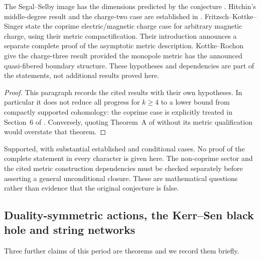\begin{theorem}\label{thm:senconj}
The Segal--Selby image has the dimensions predicted by the conjecture \cite{SegalSelby96}. Hitchin's middle-degree result and the charge-two case are established in \cite{Hitchin00}. Fritzsch--Kottke--Singer \cite[Theorem~1.2 and Section~6]{FKS18} state the coprime electric/magnetic charge case for arbitrary magnetic charge, using their metric compactification. Their introduction announces a separate complete proof of the asymptotic metric description. Kottke--Rochon \cite[Theorem~A]{KottkeRochon24} give the charge-three result provided the monopole metric has the announced quasi-fibered boundary structure. These hypotheses and dependencies are part of the statements, not additional results proved here.
\end{theorem}
\begin{proof}
This paragraph records the cited results with their own hypotheses. In particular it does not reduce all progress for $k\ge4$ to a lower bound from compactly supported cohomology: the coprime case is explicitly treated in Section~6 of \cite{FKS18}. Conversely, quoting Theorem~A of \cite{KottkeRochon24} without its metric qualification would overstate that theorem.
\end{proof}
\begin{verdict}[claim 3]
Supported, with substantial established and conditional cases. No proof of the complete statement in every character is given here. The non-coprime sector and the cited metric construction dependencies must be checked separately before asserting a general unconditional closure. These are mathematical questions rather than evidence that the original conjecture is false.
\end{verdict}

\subsection{Duality-symmetric actions, the Kerr--Sen black hole and string networks}\label{ssec:misc}

Three further claims of this period are theorems and we record them briefly.

